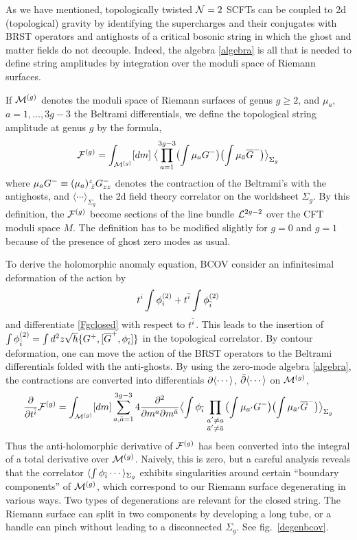 As we have mentioned, topologically twisted ${\cal N}=2$ SCFTs can be coupled to 
2d (topological) gravity by identifying the supercharges and their conjugates
with BRST operators and antighosts of a critical bosonic string in which
the ghost and matter fields do not decouple. Indeed, the algebra \eqref{algebra} 
is all that is needed to define string amplitudes by integration over the moduli 
space of Riemann surfaces.

If ${\cal M}^{(g)}$ denotes the moduli space of Riemann surfaces of genus $g\ge 2$, 
and $\mu_a$, $a=1,\ldots,3g-3$ the Beltrami differentials, we define the 
topological string amplitude at genus $g$ by the formula,
\begin{equation}
\eqlabel{Fgclosed}
\Fc g = \int_{\calmc g}  [dm] \; \bigl\langle \prod_{a=1}^{3g-3} 
\bigl(\int \mu_a G^-\bigr)
\bigl(\int \mu_\ab \Gb^-\bigr) \bigr\rangle_{\Sigma_g}
\end{equation}
where $\mu_a G^-\equiv (\mu_a)^z_{\;{\bar z}} G^-_{zz}$ denotes the contraction of the 
Beltrami's with the antighosts, and $\langle\cdots\rangle_{\Sigma_g}$ the 2d 
field theory correlator on the worldsheet $\Sigma_g$. By this definition, 
the ${{\cal F}}^{(g)}$ become sections of the line bundle ${\cal L}^{2g-2}$ over the CFT 
moduli space $M$. The definition has to be modified slightly for $g=0$ and
$g=1$ because of the presence of ghost zero modes as usual. 

To derive the holomorphic anomaly equation, BCOV consider an infinitesimal 
deformation of the action by
\begin{equation}
t^i \int \phi_i^{(2)} + t^{\bar i} \int\phi_{\bar i}^{(2)}
\end{equation}
and differentiate \eqref{Fgclosed} with respect to $t^{\bar i}$. This leads to the
insertion of $\int\phi_{\bar i}^{(2)}=\int d^2z \sqrt{h} \{G^+,[{\overline G}^+,\phi_{\bar i}]\}$ 
in the topological correlator. By contour deformation, one can 
move the action of the BRST operators to the Beltrami differentials folded 
with the anti-ghosts. By using the zero-mode algebra \eqref{algebra}, the 
contractions are converted into differentials $\partial\langle\cdots\rangle$, 
$\bar\partial\langle\cdots\rangle$ on ${\cal M}^{(g)}$,
\begin{equation}
\frac{\del}{\del t^\ib} \Fc g =\int_{\calmc g} [dm]
\sum_{a,\ab=1}^{3g-3} 4 \frac{\del^2}{\del m^a\del m^\ab} \bigl\langle \int \phi_\ib 
\prod_{\topa{a'\neq a}{\ab'\neq\ab}}
\bigl(\int\mu_{a'} G^-\bigr)
\bigl(\int\mu_{\ab'} \Gb^-\bigr) \bigr\rangle_{\Sigma_g}
\end{equation}
Thus the anti-holomorphic derivative of ${{\cal F}}^{(g)}$ has been converted into
the integral of a total derivative over ${\cal M}^{(g)}$. Naively, this is
zero, but a careful analysis reveals that the correlator 
$\langle\int\phi_{\bar i} \cdots\rangle_{\Sigma_g}$ exhibits singularities 
around certain ``boundary components'' of ${\cal M}^{(g)}$, which correspond 
to our Riemann surface degenerating in various ways. Two types of 
degenerations are relevant for the closed string. The Riemann
surface can split in two components by developing a long tube, or
a handle can pinch without leading to a disconnected $\Sigma_g$. See 
fig.\ \ref{degenbcov}.


